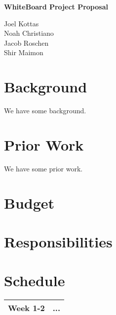 \documentclass[12pt]{article}
\begin{document}
\huge{\textbf{WhiteBoard Project Proposal}}

\vspace{10 pt}

\large{
    \noindent
    Joel Kottas\\Noah Christiano\\Jacob Roschen\\Shir Maimon
}

\vspace{10 pt}

\section{Background}

We have some background.

\section{Prior Work}

We have some prior work.\cite{Hi}

\section{Budget}

\section{Responsibilities}

\section{Schedule}

\begin{tabular}{|l|l|}
    \hline
    Week 1-2&...\\
    \hline
\end{tabular}


{}

\end{document}
